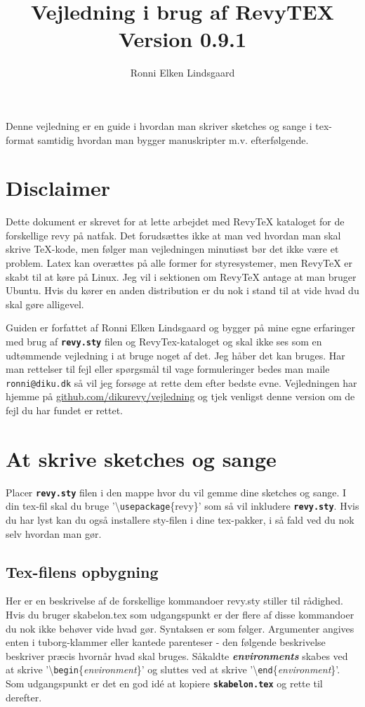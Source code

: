 \documentclass{article}
\title{Vejledning i brug af RevyTEX\\Version 0.9.1}
\author{Ronni Elken Lindsgaard}
\newcommand{\env}[1]{\textit{#1}}
\newcommand{\fname}[1]{\textbf{\texttt{#1}}}
\newcommand{\cmd}[1]{\textbackslash \texttt{#1}}
\newcommand{\envbegin}[1]{\cmd{begin}\{\env{#1}\}}
\newcommand{\envend}[1]{\cmd{end}\{\env{#1}\}}
\newcommand{\term}[1]{\textbf{\textit{#1}}}
\begin{document}
\maketitle
Denne vejledning er en guide i hvordan man skriver sketches og sange i
tex-format samtidig hvordan man bygger manuskripter m.v. efterfølgende.
\section{Disclaimer}
Dette dokument er skrevet for at lette arbejdet med RevyTeX kataloget
for de forskellige revy på natfak. Det forudsættes ikke at man ved
hvordan man skal skrive TeX-kode, men følger man vejledningen
minutiøst bør det ikke være et problem. Latex kan overættes på alle
former for styresystemer, men RevyTeX er skabt til at køre på Linux.
Jeg vil i sektionen om RevyTeX antage at man bruger Ubuntu. Hvis du
kører en anden distribution er du nok i stand til at vide hvad du skal
gøre alligevel.

Guiden er forfattet af Ronni Elken Lindsgaard og bygger på mine egne
erfaringer med brug af \fname{revy.sty} filen og RevyTex-kataloget og
skal ikke ses som en udtømmende vejledning i at bruge noget af det.
Jeg håber det kan bruges. Har man rettelser til fejl eller spørgsmål til
vage formuleringer bedes man maile
\texttt{ronni@diku.dk} så vil jeg forsøge at rette dem efter bedste
evne. Vejledningen har hjemme på \url{github.com/dikurevy/vejledning} og
tjek venligst denne version om de fejl du har fundet er rettet.

\section{At skrive sketches og sange}
Placer \fname{revy.sty} filen i den mappe hvor du vil gemme dine
sketches og sange. I din tex-fil skal du bruge '\cmd{usepackage}\{revy\}' som
så vil inkludere \fname{revy.sty}. Hvis du har lyst kan du også installere
sty-filen i dine tex-pakker, i så fald ved du nok selv hvordan man gør.

\subsection{Tex-filens opbygning}
Her er en beskrivelse af de forskellige kommandoer revy.sty stiller til
rådighed. Hvis du bruger skabelon.tex som udgangspunkt er der flere af
disse kommandoer du nok ikke behøver vide hvad gør.
Syntaksen er som følger. Argumenter angives enten i tuborg-klammer eller
kantede parenteser - den følgende beskrivelse beskriver præcis hvornår
hvad skal bruges. Såkaldte \term{environments} skabes ved at skrive
'\envbegin{environment}' og sluttes ved at skrive
'\envend{environment}'.
Som udgangspunkt er det en god idé at kopiere \fname{skabelon.tex} og rette til
derefter.
\end{document}
